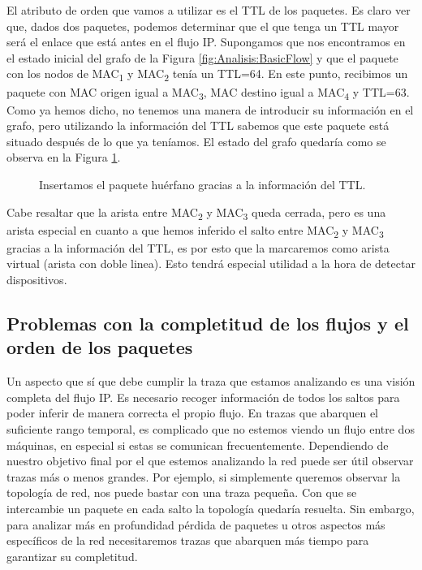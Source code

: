 \documentclass[twoside, 12pt]{epstfg}
\begin{document}
El atributo de orden que vamos a utilizar es el TTL de los paquetes. Es claro ver que, dados dos paquetes, podemos determinar que el que tenga un TTL mayor será el enlace que está antes en el flujo IP. Supongamos que nos encontramos en el estado inicial del grafo de la Figura \ref{fig:Analisis:BasicFlow} y que el paquete con los nodos de MAC\textsubscript{1} y MAC\textsubscript{2} tenía un TTL=64. En este punto, recibimos un paquete con MAC origen igual a MAC\textsubscript{3}, MAC destino igual a MAC\textsubscript{4} y TTL=63. Como ya hemos dicho, no tenemos una manera de introducir su información en el grafo, pero utilizando la información del TTL sabemos que este paquete está situado después de lo que ya teníamos. El estado del grafo quedaría como se observa en la Figura \ref{fig:Analisis:OrphanPath}.
\begin{figure}[H]
\centering

\caption[Ejemplo de resolución de camino huérfano]{Insertamos el paquete huérfano gracias a la información del TTL.}
\label{fig:Analisis:OrphanPath}
\end{figure}

Cabe resaltar que la  arista entre MAC\textsubscript{2} y MAC\textsubscript{3} queda cerrada, pero es una arista especial en cuanto a que hemos inferido el salto entre MAC\textsubscript{2} y MAC\textsubscript{3} gracias a la información del TTL, es por esto que la marcaremos como arista virtual (arista con doble linea). Esto tendrá especial utilidad a la hora de detectar dispositivos.

\subsection{Problemas con la completitud de los flujos y el orden de los paquetes}
Un aspecto que sí que debe cumplir la traza que estamos analizando es una visión completa del flujo IP. Es necesario recoger información de todos los saltos para poder inferir de manera correcta el propio flujo. En trazas que abarquen el suficiente rango temporal, es complicado que no estemos viendo un flujo entre dos máquinas, en especial si estas se comunican frecuentemente. Dependiendo de nuestro objetivo final por el que estemos analizando la red puede ser útil observar trazas más o menos grandes. Por ejemplo, si simplemente queremos observar la topología de red, nos puede bastar con una traza pequeña. Con que se intercambie un paquete en cada salto la topología quedaría resuelta. Sin embargo, para analizar más en profundidad pérdida de paquetes u otros aspectos más específicos de la red necesitaremos trazas que abarquen más tiempo para garantizar su completitud.
\end{document}
